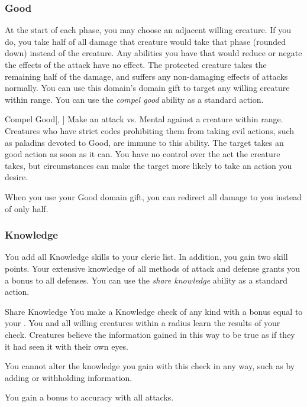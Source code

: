         \subsubsection{Good}
             At the start of each phase, you may choose an adjacent willing creature.
            If you do, you take half of all damage that creature would take that phase (rounded down) instead of the creature.
            Any abilities you have that would reduce or negate the effects of the attack have no effect.
            The protected creature takes the remaining half of the damage, and suffers any non-damaging effects of attacks normally.
             You can use this domain's domain gift to target any willing creature within \rngclose range.
             You can use the \textit{compel good} ability as a standard action.
            \begin{apability}{Compel Good}[, ]
                Make an attack vs. Mental against a creature within \rngmed range.
                Creatures who have strict codes prohibiting them from taking evil actions, such as paladins devoted to Good, are immune to this ability.
                \hit The target takes an good action as soon as it can.
                You have no control over the act the creature takes, but circumstances can make the target more likely to take an action you desire.
            \end{apability}
             When you use your Good domain gift, you can redirect all damage to you instead of only half.

        \subsubsection{Knowledge}
             You add all Knowledge skills to your cleric  list.
            In addition, you gain two skill points.
             Your extensive knowledge of all methods of attack and defense grants you a  bonus to all defenses.
             You can use the \textit{share knowledge} ability as a standard action.
            \begin{apability}{Share Knowledge}
                You make a Knowledge check of any kind with a bonus equal to your .
                You and all willing creatures within a \arealarge radius learn the results of your check.
                Creatures believe the information gained in this way to be true as if they it had seen it with their own eyes.

                You cannot alter the knowledge you gain with this check in any way, such as by adding or withholding information.
            \end{apability}
             You gain a  bonus to accuracy with all attacks.

